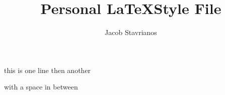 \documentclass[12pt]{article}
\title{Personal \LaTeX Style File}
\author{Jacob Stavrianos}
\begin{document}

this is one line
then another

with a space in between
\end{document}
